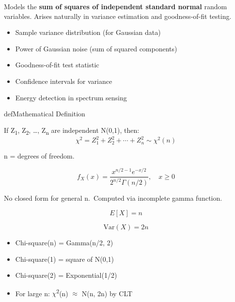 

Models the \textbf{sum of squares of independent standard normal} random variables. Arises naturally in variance estimation and goodness-of-fit testing.


\begin{itemize}
\tightlist
\item
  Sample variance distribution (for Gaussian data)
\item
  Power of Gaussian noise (sum of squared components)
\item
  Goodness-of-fit test statistic
\item
  Confidence intervals for variance
\item
  Energy detection in spectrum sensing
\end{itemize}

\begin{PSbox}[unbreakable]{def}{Mathematical Definition}

If Z\textsubscript{1}, Z\textsubscript{2}, …, Z\textsubscript{n} are independent N(0,1), then:\PSbr{}\[\chi^2 = Z_1^2 + Z_2^2 + \cdots + Z_n^2 \sim \chi^2(n)\]

n = degrees of freedom.

\end{PSbox}


\[f_X(x) = \frac{x^{n/2-1} e^{-x/2}}{2^{n/2}\Gamma(n/2)}, \quad x \geq 0\]


No closed form for general n. Computed via incomplete gamma function.


\[E[X] = n\]


\[\text{Var}(X) = 2n\]


\begin{itemize}
\tightlist
\item
  Chi-square(n) = Gamma(n/2, 2)
\item
  Chi-square(1) = square of N(0,1)
\item
  Chi-square(2) = Exponential(1/2)
\item
  For large n: \ensuremath{\chi}\textsuperscript{2}(n) \ensuremath{\approx} N(n, 2n) by CLT
\end{itemize}


